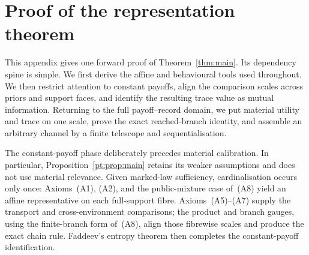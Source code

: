 \section{Proof of the representation theorem}
\label{app:main-proof}

This appendix gives one forward proof of Theorem~\ref{thm:main}.  Its
dependency spine is simple.  We first derive the affine and behavioural tools
used throughout.  We then restrict attention to constant payoffs, align the
comparison scales across priors and support faces, and identify the resulting
trace value as mutual information.  Returning to the full payoff--record
domain, we put material utility and trace on one scale, prove the exact
reached-branch identity, and assemble an arbitrary channel by a finite
telescope and sequentialisation.

The constant-payoff phase deliberately precedes material calibration.  In
particular, Proposition~\ref{pt:prop:main} retains its weaker assumptions and
does not use material relevance.  Given marked-law sufficiency,
cardinalisation occurs only once: Axioms~\textup{(A1)}, \textup{(A2)}, and the
public-mixture case of~\textup{(A8)} yield an affine representative on each
full-support fibre.  Axioms~\textup{(A5)--(A7)} supply the transport and
cross-environment comparisons; the product and branch gauges, using the
finite-branch form of~\textup{(A8)}, align those fibrewise scales and produce
the exact chain rule.  Faddeev's entropy theorem then completes the
constant-payoff identification.






